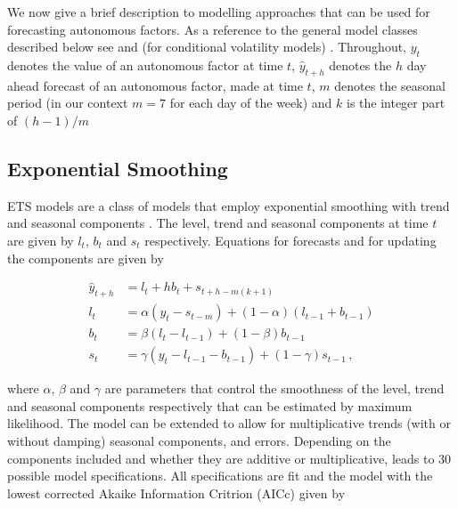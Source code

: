 \documentclass{article}
\begin{document}
We now give a brief description to modelling approaches that can be used for forecasting autonomous factors. As a reference to the general model classes described below see \cite{HynAth2021} and (for conditional volatility models) \citet{Tsay2005}. Throughout, $y_t$ denotes the value of an autonomous factor at time $t$, $\hat{y}_{t+h}$ denotes the $h$ day ahead forecast of an autonomous factor, made at time $t$, $m$ denotes the seasonal period (in our context $m=7$ for each day of the week) and $k$ is the integer part of $(h-1)/m$



\subsection{Exponential Smoothing}

ETS models are a class of models that employ exponential smoothing with trend and seasonal components \citep[see][for details]{HynEtAl2008}. The level, trend and seasonal components at time $t$ are given by $l_t$, $b_t$ and $s_t$ respectively. Equations for forecasts and for updating the components are given by

\begin{align}
\hat{y}_{t+h}&=l_t+hb_t+s_{t+h-m(k+1)}\\
l_t&=\alpha (y_t-s_{t-m})+(1-\alpha)(l_{t-1}+{b_{t-1}})\\
b_t&=\beta (l_t-l_{t-1})+(1-\beta)b_{t-1}\\
s_t&=\gamma (y_t-l_{t-1}-b_{t-1})+(1-\gamma)s_{t-1}\,,
\end{align}

where $\alpha$, $\beta$ and $\gamma$ are parameters that control the smoothness of the level, trend and seasonal components respectively that can be estimated by maximum likelihood. The model can be extended to allow for  multiplicative trends (with or without damping) seasonal components, and errors. Depending on the components included and whether they are additive or multiplicative, leads to 30 possible model specifications. All specifications are fit and the model with the lowest corrected Akaike Information Critrion (AICc) given by
\end{document}
